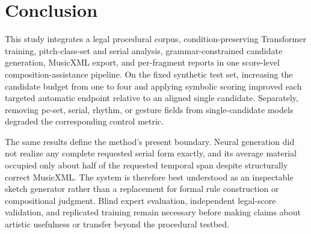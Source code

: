 \section{Conclusion}
\label{sec:conclusion}

This study integrates a legal procedural corpus, condition-preserving Transformer training, pitch-class-set and serial analysis, grammar-constrained candidate generation, MusicXML export, and per-fragment reports in one score-level composition-assistance pipeline. On the fixed synthetic test set, increasing the candidate budget from one to four and applying symbolic scoring improved each targeted automatic endpoint relative to an aligned single candidate. Separately, removing pc-set, serial, rhythm, or gesture fields from single-candidate models degraded the corresponding control metric.

The same results define the method's present boundary. Neural generation did not realize any complete requested serial form exactly, and its average material occupied only about half of the requested temporal span despite structurally correct MusicXML. The system is therefore best understood as an inspectable sketch generator rather than a replacement for formal rule construction or compositional judgment. Blind expert evaluation, independent legal-score validation, and replicated training remain necessary before making claims about artistic usefulness or transfer beyond the procedural testbed.
